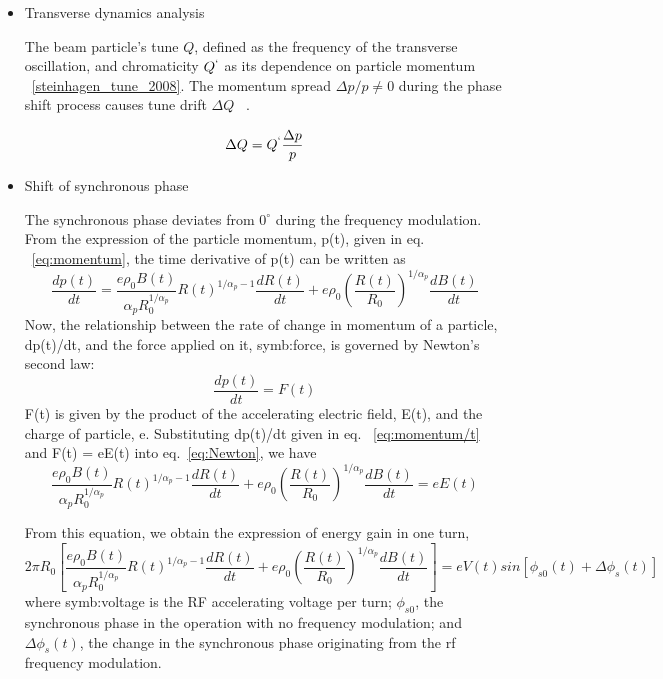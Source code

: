 \begin{itemize}
	\item Transverse dynamics analysis

The beam particle’s tune  $Q$, defined as the frequency of the transverse oscillation, and chromaticity $Q^`$ as its
dependence on particle momentum ~\ref{steinhagen_tune_2008}. The momentum spread ${\Delta{p}}/{p} \neq 0$ during the phase shift process causes tune drift $\Delta{Q}$ ~\cite{holzer_introduction_2013}.

\begin{equation}
\Delta{Q} = Q^`\frac{\Delta{p}}{p}
\label{eq:chromaticity}
\end{equation} 
	\item Shift of synchronous phase

The synchronous phase deviates from $0^\circ$ during the frequency modulation. From the expression of the particle momentum, p(t), given in eq. ~\ref{eq:momentum}, the time derivative of p(t) can be written as
\begin{equation}
\frac {dp(t)}{dt} = \frac {e\rho_0B(t)}{\alpha_pR_0^{1/\alpha_p}}R(t)^{1/\alpha_p-1}\frac{dR(t)}{dt}+e\rho_0 (\frac {R(t)}{R_0})^{1/\alpha_p }\frac{dB(t)}{dt}
\label{eq:momentum/t}
\end{equation} 
Now, the relationship between the rate of change in momentum of a particle, dp(t)/dt,
and the force applied on it, \gls{symb:force}, is governed by Newton’s second law:
\begin{equation}
\frac {dp(t)}{dt} = F(t)
\label{eq:Newton}
\end{equation} 
F(t) is given by the product of the accelerating electric field, E(t), and the
charge of particle, e. Substituting dp(t)/dt given in eq. ~\ref{eq:momentum/t} and F(t) = eE(t) into eq.~\ref{eq:Newton}, we have
\begin{equation}
 \frac {e\rho_0B(t)}{\alpha_pR_0^{1/\alpha_p}}R(t)^{1/\alpha_p-1}\frac{dR(t)}{dt}+e\rho_0 (\frac {R(t)}{R_0})^{1/\alpha_p }\frac{dB(t)}{dt}=eE(t)
\label{eq:f=eq}
\end{equation} 

From this equation, we obtain the expression of energy gain in one turn,
\begin{equation}
2\pi R_0 [\frac {e\rho_0B(t)}{\alpha_pR_0^{1/\alpha_p}}R(t)^{1/\alpha_p-1}\frac{dR(t)}{dt}+e\rho_0 (\frac {R(t)}{R_0})^{1/\alpha_p }\frac{dB(t)}{dt}]=eV(t)sin[\phi_{s0}(t)+\Delta \phi_s(t)]
\label{eq:energy_cycle}
\end{equation} 
where \gls{symb:voltage} is the RF accelerating voltage per turn; $\phi_{s0}$, the synchronous phase in the
operation with no frequency modulation; and $\Delta\phi_{s}(t)$, the change in the synchronous phase originating from the rf frequency modulation.


\end{itemize}
